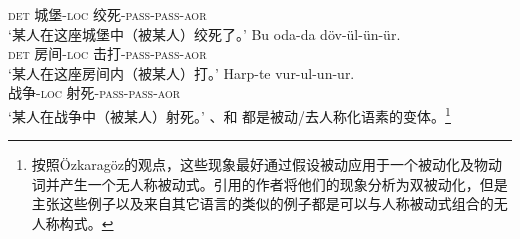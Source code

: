      \textsc{det} 城堡-\textsc{loc} 绞死-\textsc{pass}-\textsc{pass}-\textsc{aor}\\
\glt `某人在这座城堡中（被某人）绞死了。'
\ex\label{ex-double-passivization-hit}
\gll Bu oda-da döv-ül-ün-ür.\\
     \textsc{det} 房间-\textsc{loc} 击打-\textsc{pass}-\textsc{pass}-\textsc{aor}\\
\glt `某人在这座房间内（被某人）打。'
\ex
\gll Harp-te vur-ul-un-ur.\\
     战争-\textsc{loc} 射死-\textsc{pass}-\textsc{pass}-\textsc{aor}\\
\glt `某人在战争中（被某人）射死。'
\zl
{}、和 都是被动/去人称化语素的变体。\footnote{按照Özkara\-göz的观点，这些现象最好通过假设被动应用于一个被动化及物动词并产生一个无人称被动式。引用的作者将他们的现象分析为双被动化，但是\citet{Blevins2003a}主张这些例子以及来自其它语言的类似的例子都是可以与人称被动式组合的无人称构式。}

